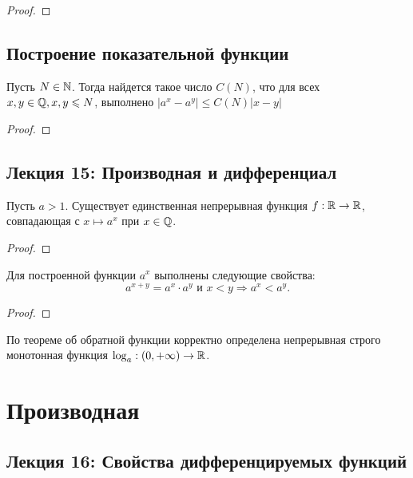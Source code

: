 	\begin{proof}
	\end{proof}
	
	\section{Построение показательной функции}
	
	\begin{lemma}
		Пусть $N \in \mathbb N$. Тогда найдется такое число $C(N)$, что для всех $x, y \in \mathbb Q, x, y \leqslant N$, выполнено $|a^x - a^y| \leqslant C(N)|x - y|$
	\end{lemma}
	
	\begin{proof}
	\end{proof}
	
	\newpage
	
	\section*{Лекция 15: Производная и дифференциал}
	
	\begin{theorem}
		Пусть $a > 1$. Существует единственная непрерывная функция $f : \mathbb R \rightarrow \mathbb R$, совпадающая с $x \mapsto a^x$ при $x \in \mathbb Q$.
	\end{theorem}
	
	\begin{proof}
	\end{proof}
	
	\begin{corollary}
		Для построенной функции $a^x$ выполнены следующие свойства:
		\[ a^{x + y} = a^x \cdot a^y \text{ и } x < y \Rightarrow a^x < a^y. \]
	\end{corollary}
	
	\begin{proof}
	\end{proof}
	
	По теореме об обратной функции корректно определена
	непрерывная строго монотонная функция $\log_a : (0, +\infty) \rightarrow \mathbb R$.
	
	\chapter{Производная}
	
	\section*{Лекция 16: Свойства дифференцируемых функций}
	
